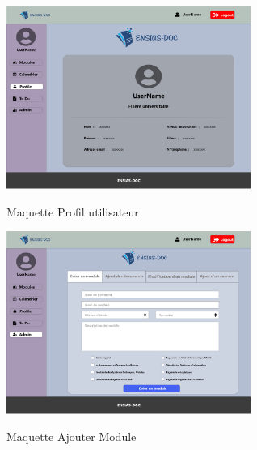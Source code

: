 \documentclass{article}
\begin{document}
{ \begin{minipage}[c]{.46\linewidth}
     \begin{center}
      \vspace{1cm}
             \includegraphics[width=8cm]{Profile (1).png}
             \caption{Maquette Profil utilisateur}
             \label{fig:Maquette Profil utilisateur}
         \end{center}
   \end{minipage} \hfill
   \begin{minipage}[c]{.46\linewidth}
    \begin{center}
    \vspace{1cm}
            \includegraphics[width=8cm]{Admin-1 (2).png}
            \caption{Maquette Ajouter Module}
            \label{Maquette Ajouter Module}
        \end{center}
 \end{minipage}
 
}
\end{document}
